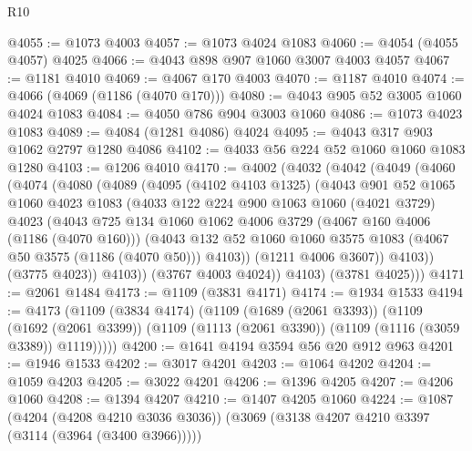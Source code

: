 \begin{lexlean}{R10}
\begin{coremodule}
@4055 := @1073 @4003
@4057 := @1073 @4024 @1083
@4060 := @4054 (@4055 @4057) @4025
@4066 := @4043 @898 @907 @1060 @3007 @4003 @4057
@4067 := @1181 @4010
@4069 := @4067 @170 @4003
@4070 := @1187 @4010
@4074 := @4066 (@4069 (@1186 (@4070 @170)))
@4080 := @4043 @905 @52 @3005 @1060 @4024 @1083
@4084 := @4050 @786 @904 @3003 @1060
@4086 := @1073 @4023 @1083
@4089 := @4084 (@1281 @4086) @4024
@4095 := @4043 @317 @903 @1062 @2797 @1280 @4086
@4102 := @4033 @56 @224 @52 @1060 @1060 @1083 @1280
@4103 := @1206 @4010
@4170 := @4002
    (@4032
      (@4042
        (@4049
          (@4060
            (@4074
              (@4080
                (@4089
                  (@4095
                    (@4102 @4103 @1325)
                    (@4043
                      @901
                      @52
                      @1065
                      @1060
                      @4023
                      @1083
                      (@4033
                        @122
                        @224
                        @900
                        @1063
                        @1060
                        (@4021 @3729)
                        @4023
                        (@4043
                          @725
                          @134
                          @1060
                          @1062
                          @4006
                          @3729
                          (@4067 @160 @4006 (@1186 (@4070 @160)))
                          (@4043
                            @132
                            @52
                            @1060
                            @1060
                            @3575
                            @1083
                            (@4067 @50 @3575 (@1186 (@4070 @50)))
                            @4103))
                        (@1211 @4006 @3607))
                      @4103))
                  (@3775 @4023))
                @4103))
            (@3767 @4003 @4024))
          @4103)
        (@3781 @4025)))
@4171 := @2061 @1484
@4173 := @1109 (@3831 @4171)
@4174 := @1934 @1533
@4194 := @4173
    (@1109
      (@3834 @4174)
      (@1109
        (@1689 (@2061 @3393))
        (@1109
          (@1692 (@2061 @3399))
          (@1109 (@1113 (@2061 @3390)) (@1109 (@1116 (@3059 @3389)) @1119)))))
@4200 := @1641 @4194 @3594 @56 @20 @912 @963
@4201 := @1946 @1533
@4202 := @3017 @4201
@4203 := @1064 @4202
@4204 := @1059 @4203
@4205 := @3022 @4201
@4206 := @1396 @4205
@4207 := @4206 @1060
@4208 := @1394 @4207
@4210 := @1407 @4205 @1060
@4224 := @1087
    (@4204 (@4208 @4210 @3036 @3036))
    (@3069 (@3138 @4207 @4210 @3397 (@3114 (@3964 (@3400 @3966)))))

\end{coremodule}
\end{lexlean}
